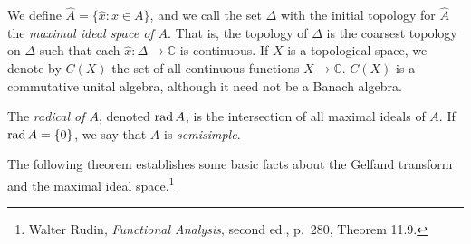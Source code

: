 \documentclass{article}
\newcommand{\rad}{\ensuremath\mathrm{rad}\,}
\theoremstyle{definition}
\begin{document}
We define $\widehat{A}=\{\hat{x}:x \in A\}$, and we call the set $\Delta$ with the initial topology for $\widehat{A}$ the {\em maximal ideal space of $A$}. That is,
the topology of $\Delta$ is the coarsest topology on $\Delta$ such that each $\hat{x}:\Delta \to \mathbb{C}$ is continuous. 
If $X$ is a topological space, we denote by $C(X)$ the set of all continuous functions $X \to \mathbb{C}$. $C(X)$ is a commutative unital algebra, although it need not be a Banach algebra.

The {\em radical of $A$}, denoted $\rad A$, is the intersection of all maximal ideals of $A$. If $\rad A= \{0\}$, we say that $A$ is {\em semisimple}.


The following theorem establishes some basic facts about the Gelfand transform and the maximal ideal space.\footnote{Walter
Rudin, {\em Functional Analysis}, second ed., p.~280, Theorem 11.9.}
\end{document}
